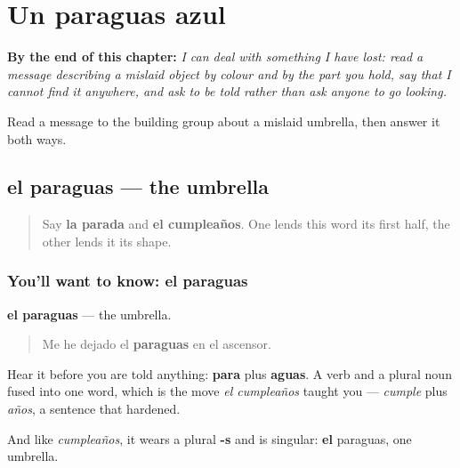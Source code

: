 
\chapter{Un paraguas azul}
\label{ch:es-paraguas}

\begin{chapteropening}
\textbf{By the end of this chapter:} \emph{I can deal with something I have lost: read a message describing a mislaid object by colour and by the part you hold, say that I cannot find it anywhere, and ask to be told rather than ask anyone to go looking.}

Read a message to the building group about a mislaid umbrella, then answer it both ways.
\end{chapteropening}

\section[el paraguas]{el paraguas — the umbrella}

\label{lesson:ES-C470-paraguas}



\begin{quote}
Say \textbf{la parada} and \textbf{el cumpleaños}. One lends this word its first half, the other lends it its shape.
\end{quote}

\subsection*{You'll want to know: el paraguas}
\textbf{el paraguas} — the umbrella.

\begin{quote}
Me he dejado el \textbf{paraguas} en el ascensor.
\end{quote}

Hear it before you are told anything: \textbf{para} plus \textbf{aguas}. A verb and a plural noun fused into one word, which is the move \emph{el cumpleaños} taught you — \emph{cumple} plus \emph{años}, a sentence that hardened.

And like \emph{cumpleaños}, it wears a plural \textbf{-s} and is singular: \textbf{el} paraguas, one umbrella.

